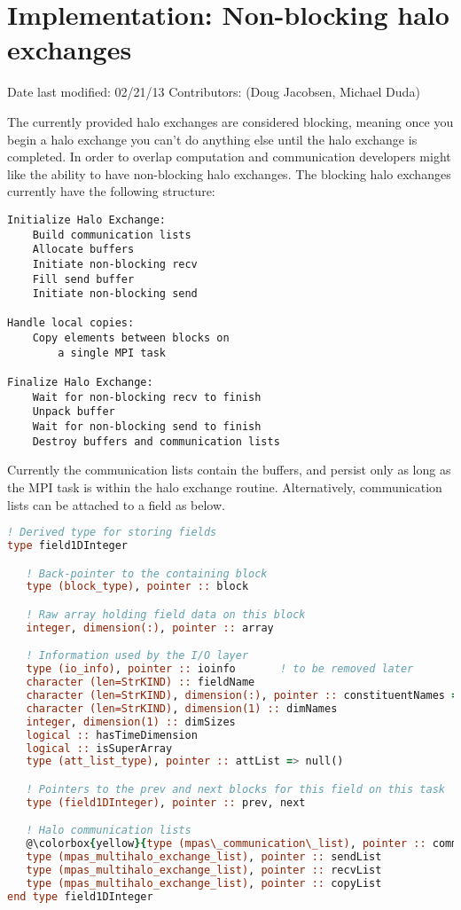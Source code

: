 \documentclass[11pt]{report}
\begin{document}
\section{Implementation: Non-blocking halo exchanges}
Date last modified: 02/21/13
Contributors: (Doug Jacobsen, Michael Duda)

The currently provided halo exchanges are considered blocking, meaning once you
begin a halo exchange you can't do anything else until the halo exchange is
completed. In order to overlap computation and communication developers might
like the ability to have non-blocking halo exchanges. The blocking halo
exchanges currently have the following structure:

{\tiny
\begin{lstlisting}
Initialize Halo Exchange:
	Build communication lists
	Allocate buffers
	Initiate non-blocking recv
	Fill send buffer
	Initiate non-blocking send

Handle local copies:
	Copy elements between blocks on
		a single MPI task

Finalize Halo Exchange:
	Wait for non-blocking recv to finish
	Unpack buffer
	Wait for non-blocking send to finish
	Destroy buffers and communication lists
\end{lstlisting}
}

Currently the communication lists contain the buffers, and persist only as long
as the MPI task is within the halo exchange routine. Alternatively,
communication lists can be attached to a field as below.

\pagebreak

{\tiny
\begin{lstlisting}[language=fortran,escapechar=@,frame=single]
! Derived type for storing fields
type field1DInteger

   ! Back-pointer to the containing block
   type (block_type), pointer :: block

   ! Raw array holding field data on this block
   integer, dimension(:), pointer :: array

   ! Information used by the I/O layer
   type (io_info), pointer :: ioinfo       ! to be removed later
   character (len=StrKIND) :: fieldName
   character (len=StrKIND), dimension(:), pointer :: constituentNames => null()
   character (len=StrKIND), dimension(1) :: dimNames
   integer, dimension(1) :: dimSizes
   logical :: hasTimeDimension
   logical :: isSuperArray
   type (att_list_type), pointer :: attList => null()     

   ! Pointers to the prev and next blocks for this field on this task
   type (field1DInteger), pointer :: prev, next

   ! Halo communication lists
   @\colorbox{yellow}{type (mpas\_communication\_list), pointer :: commSendList, commRecvList}@
   type (mpas_multihalo_exchange_list), pointer :: sendList
   type (mpas_multihalo_exchange_list), pointer :: recvList
   type (mpas_multihalo_exchange_list), pointer :: copyList
end type field1DInteger
\end{lstlisting}
}
\end{document}
